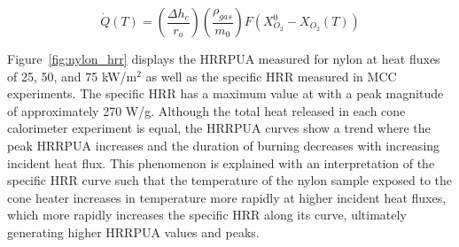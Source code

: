 \documentclass[12pt,oneside]{book}
\begin{document}
\begin{equation}
\dot{Q}(T) = \left(\frac{\Delta{h_c}}{r_o}\right)\left(\frac{\rho_{gas}}{m_0}\right)F(X_{O_2}^0-X_{O_2}(T))  \label{eq:mcc_hrr}
\end{equation}

Figure~\ref{fig:nylon_hrr} displays the HRRPUA measured for nylon at heat fluxes of 25, 50, and 75 kW/m$^2$ as well as the specific HRR measured in MCC experiments. The specific HRR has a maximum value at  with a peak magnitude of approximately 270 W/g. Although the total heat released in each cone calorimeter experiment is equal, the HRRPUA curves show a trend where the peak HRRPUA increases and the duration of burning decreases with increasing incident heat flux. This phenomenon is explained with an interpretation of the specific HRR curve such that the temperature of the nylon sample exposed to the cone heater increases in temperature more rapidly at higher incident heat fluxes, which more rapidly increases the specific HRR along its curve, ultimately generating higher HRRPUA values and peaks. 
\end{document}
